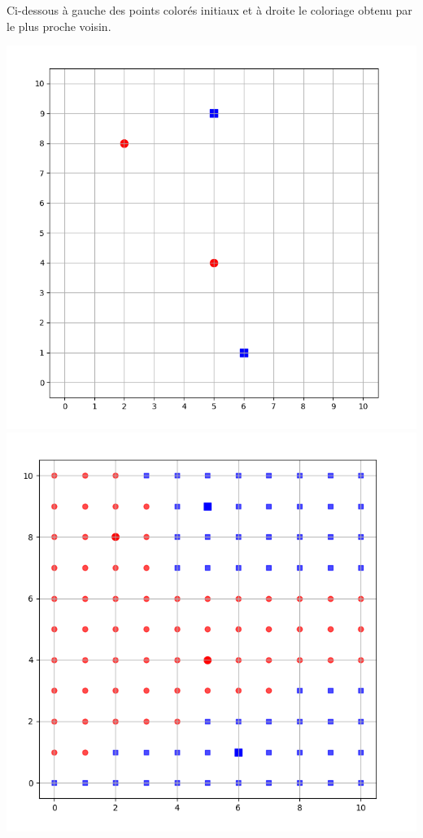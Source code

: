 \documentclass[10pt,class=report,crop=false]{standalone}
\begin{document}
\begin{activite}
\begin{enumerate}
	Ci-dessous à gauche des points colorés initiaux et à droite le coloriage obtenu par le plus proche voisin. 
	\begin{center}
	\includegraphics[scale=\myscale,scale=0.25]{ecran-voisins-4} \quad
	\includegraphics[scale=\myscale,scale=0.25]{ecran-voisins-5}
	\end{center}


\end{enumerate}
\end{activite}
\end{document}
